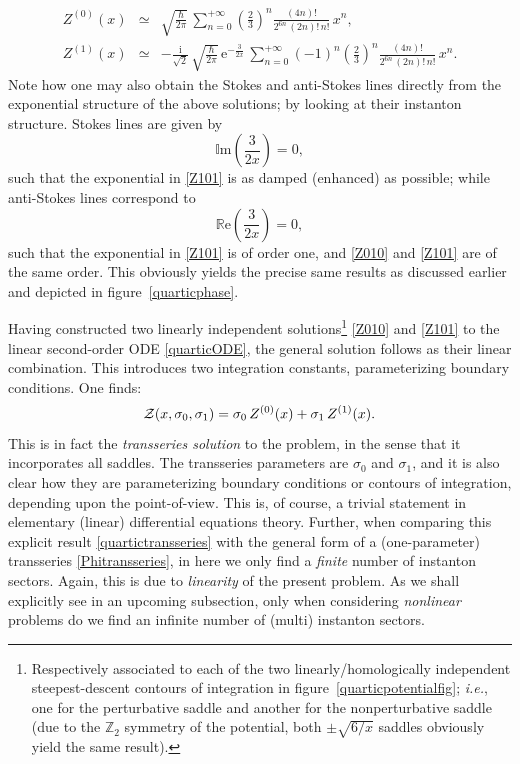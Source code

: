 \documentclass[11pt,a4paper]{article}
\newcommand{\CZ}{{\cal Z}}
\def\BZ{{\mathbb Z}}
\newcommand{\be}{\begin{equation}}
\newcommand{\ee}{\end{equation}}
\newcommand{\bea}{\begin{eqnarray}}
\newcommand{\eea}{\end{eqnarray}}
\def\im{{\mathbb{I}}{\mathrm{m}}}
\def\re{{\mathbb{R}}{\mathrm{e}}}
\newcommand{\rme}{{\mathrm{e}}}
\newcommand{\rmi}{{\mathrm{i}}}
\begin{document}
%
\bea
\label{Z010}
Z^{(0)} (x) &\simeq& \sqrt{\frac{\hbar}{2\pi}}\, \sum_{n=0}^{+\infty} \left( \frac{2}{3} \right)^n \frac{(4n)!}{2^{6n}\, (2n)!\, n!}\, x^n, \\
\label{Z101}
Z^{(1)} (x) &\simeq& -\frac{\rmi}{\sqrt{2}}\, \sqrt{\frac{\hbar}{2\pi}}\, \rme^{-\frac{3}{2x}}\, \sum_{n=0}^{+\infty} (-1)^n \left( \frac{2}{3} \right)^n \frac{(4n)!}{2^{6n}\, (2n)!\, n!}\, x^n.
\eea
%
\noindent
Note how one may also obtain the Stokes and anti-Stokes lines directly from the exponential structure of the above solutions; by looking at their instanton structure. Stokes lines are given by
%
\be
\im \left( \frac{3}{2 x} \right) = 0,
\ee
%
\noindent
such that the exponential in \eqref{Z101} is as damped (enhanced) as possible; while anti-Stokes lines correspond to
%
\be
\re \left( \frac{3}{2 x} \right) = 0,
\ee
%
\noindent
such that the exponential in \eqref{Z101} is of order one, and \eqref{Z010} and \eqref{Z101} are of the same order. This obviously yields the precise same results as discussed earlier and depicted in figure~\ref{quarticphase}.

Having constructed two linearly independent solutions\footnote{Respectively associated to each of the two linearly/homologically independent steepest-descent contours of integration in figure~\ref{quarticpotentialfig}; \textit{i.e.}, one for the perturbative saddle and another for the nonperturbative saddle (due to the $\BZ_2$ symmetry of the potential, both $\pm \sqrt{6/x}$ saddles obviously yield the same result).} \eqref{Z010} and \eqref{Z101} to the linear second-order ODE \eqref{quarticODE}, the general solution follows as their linear combination. This introduces two integration constants, parameterizing boundary conditions. One finds:
%
\be
\label{quartictransseries}
\CZ (x, \sigma_{0}, \sigma_{1}) = \sigma_{0}\, Z^{(0)}(x) + \sigma_{1}\, Z^{(1)}(x).
\ee
%
\noindent
This is in fact the \textit{transseries solution} to the problem, in the sense that it incorporates all saddles. The transseries parameters are $\sigma_{0}$ and $\sigma_{1}$, and it is also clear how they are parameterizing boundary conditions or contours of integration, depending upon the point-of-view. This is, of course, a trivial statement in elementary (linear) differential equations theory. Further, when comparing this explicit result \eqref{quartictransseries} with the general form of a (one-parameter) transseries \eqref{Phitransseries}, in here we only find a \textit{finite} number of instanton sectors. Again, this is due to \textit{linearity} of the present problem. As we shall explicitly see in an upcoming subsection, only when considering \textit{nonlinear} problems do we find an infinite number of (multi) instanton sectors.
\end{document}
